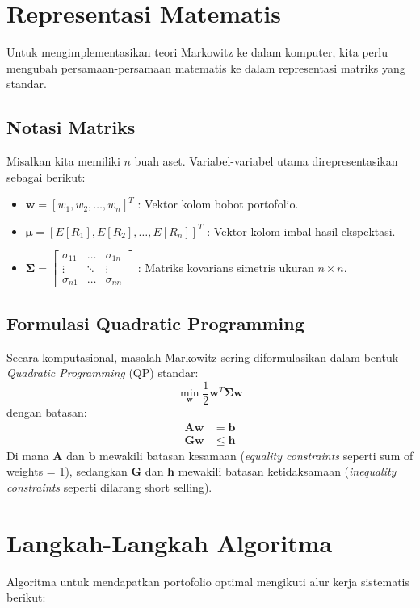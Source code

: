 \documentclass[12pt,a4paper]{book}
\begin{document}
\section{Representasi Matematis}
Untuk mengimplementasikan teori Markowitz ke dalam komputer, kita perlu mengubah persamaan-persamaan matematis ke dalam representasi matriks yang standar.

\subsection{Notasi Matriks}
Misalkan kita memiliki $n$ buah aset. Variabel-variabel utama direpresentasikan sebagai berikut:
\begin{itemize}
    \item $\mathbf{w} = [w_1, w_2, \dots, w_n]^T$ : Vektor kolom bobot portofolio.
    \item $\mathbf{\mu} = [E[R_1], E[R_2], \dots, E[R_n]]^T$ : Vektor kolom imbal hasil ekspektasi.
    \item $\mathbf{\Sigma} = \begin{bmatrix} \sigma_{11} & \dots & \sigma_{1n} \\ \vdots & \ddots & \vdots \\ \sigma_{n1} & \dots & \sigma_{nn} \end{bmatrix}$ : Matriks kovarians simetris ukuran $n \times n$.
\end{itemize}

\subsection{Formulasi Quadratic Programming}
Secara komputasional, masalah Markowitz sering diformulasikan dalam bentuk \textit{Quadratic Programming} (QP) standar:
\begin{equation}
    \min_{\mathbf{w}} \frac{1}{2} \mathbf{w}^T \mathbf{\Sigma} \mathbf{w}
\end{equation}
dengan batasan:
\begin{align}
    \mathbf{A}\mathbf{w} &= \mathbf{b} \\
    \mathbf{G}\mathbf{w} &\le \mathbf{h}
\end{align}
Di mana $\mathbf{A}$ dan $\mathbf{b}$ mewakili batasan kesamaan (\textit{equality constraints} seperti sum of weights = 1), sedangkan $\mathbf{G}$ dan $\mathbf{h}$ mewakili batasan ketidaksamaan (\textit{inequality constraints} seperti dilarang short selling).

\section{Langkah-Langkah Algoritma}
Algoritma untuk mendapatkan portofolio optimal mengikuti alur kerja sistematis berikut:
\end{document}

